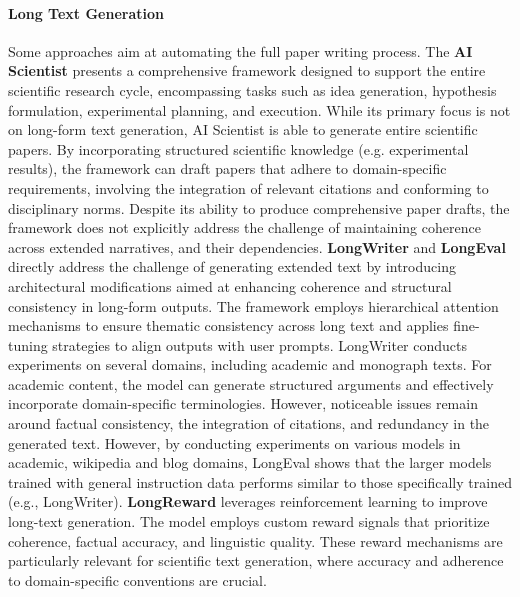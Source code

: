 \paragraph{Long Text Generation}  %
Some approaches aim at automating the full paper writing process. The \textbf{AI Scientist} \cite{lu2024aiscientist} presents a comprehensive framework designed to support the entire scientific research cycle, encompassing tasks such as idea generation, hypothesis formulation, experimental planning, and execution. While its primary focus is not on long-form text generation, AI Scientist is able to generate entire scientific papers. By incorporating structured scientific knowledge (e.g. experimental results), the framework can draft papers that adhere to domain-specific requirements, involving the integration of relevant citations and conforming to disciplinary norms. Despite its ability to produce comprehensive paper drafts, the framework does not explicitly address the challenge of maintaining coherence across extended narratives, and their dependencies. 
\textbf{LongWriter} \cite{bai2024longwriter} and \textbf{LongEval} \cite{wu2025longeval} directly address the challenge of generating extended text by introducing architectural modifications aimed at enhancing coherence and structural consistency in long-form outputs. The framework employs hierarchical attention mechanisms to ensure thematic consistency across long text and applies fine-tuning strategies to align outputs with user prompts. LongWriter conducts experiments on several domains, including academic and monograph texts. For academic content, the model %
can generate structured arguments and effectively incorporate domain-specific terminologies. However, noticeable issues remain around factual consistency, the integration of citations, and redundancy in the generated text. %
However, by conducting experiments on various models in academic, wikipedia and blog domains, LongEval shows that the larger models trained with general instruction data performs similar to those specifically trained (e.g., LongWriter).
\textbf{LongReward} %
\cite{zhang2024longrewardimprovinglongcontextlarge}
leverages reinforcement learning to improve long-text generation. The model employs custom reward signals that prioritize coherence, factual accuracy, and linguistic quality. These reward mechanisms are particularly relevant for scientific text generation, where accuracy and adherence to domain-specific conventions are crucial.


